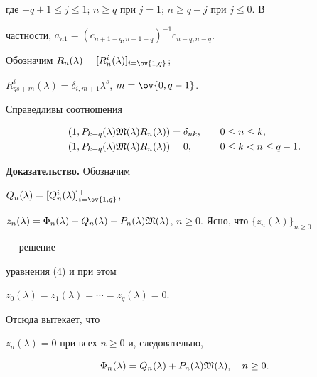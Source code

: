 где $-q+1\le j\le 1$; $n\ge q$ при $j=1$; $n\ge q-j$ при $j\le 0$. В 


частности, $a_{n1}=(c_{n+1-q,n+1-q})^{-1}c_{n-q,n-q}$. 


 


Обозначим $R_n(\lambda)=[R^i_n(\lambda)]_{i=\ov{1,q}}$; 


$R^i_{qs+m}(\lambda)=\delta_{i,m+1}\lambda^s$, $m=\ov{0,q-1}$. 


 


\begin{lem} 


Справедливы соотношения 


\begin{alignat}{2} 


(1,P_{k+q}(\lambda)\frak M(\lambda)R_n(\lambda))&=\delta_{nk}, 


&\quad &0\le n\le k, \\ 


(1,P_{k+q}(\lambda)\frak M(\lambda)R_n(\lambda))&=0, 


&\quad &0\le k<n\le q-1. 


\end{alignat} 


\end{lem} 


 


{\bf Доказательство.} Обозначим 


$Q_n(\lambda)=[Q^i_n(\lambda)]^\top_{i=\ov{1,q}}$, 


$z_n(\lambda)=\Phi_n(\lambda)-Q_n(\lambda)-P_n(\lambda) 


\frak M(\lambda)$, $n\ge 0$. Ясно, что $\{z_n(\lambda)\}_{n\ge 0}$ 


--- решение 


уравнения (4) и при этом 


$z_0(\lambda)=z_1(\lambda)=\dotsb=z_q(\lambda)=0$. 


Отсюда вытекает, что 


$z_n(\lambda)=0$ при всех $n\ge 0$ и, следовательно, 


\begin{equation} 


\Phi_n(\lambda)=Q_n(\lambda)+P_n(\lambda)\frak M(\lambda), 


\quad n\ge 0. 


\end{equation} 


